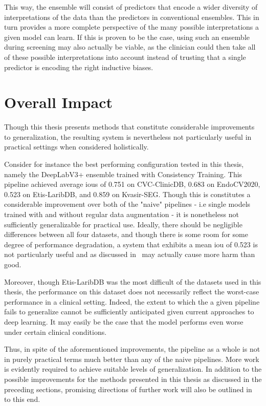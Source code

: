     This way, the ensemble will consist of predictors that encode a wider diversity of interpretations of the data than the predictors in conventional ensembles. This in turn provides a more complete perspective of the many possible interpretations a given model can learn. If this is proven to be the case, using such an ensemble during screening may also actually be viable, as the clinician could then take all of these possible interpretations into account instead of trusting that a single predictor is encoding the right inductive biases.  

\section{Overall Impact}
Though this thesis presents methods that constitute considerable improvements to generalization, the resulting system is nevertheless not particularly useful in practical settings when considered holistically. 

Consider for instance the best performing configuration tested in this thesis, namely the DeepLabV3+ ensemble trained with Consistency Training. This pipeline achieved average \glspl{iou} of 0.751 on CVC-ClinicDB, 0.683 on EndoCV2020, 0.523 on Etis-LaribDB, and 0.859 on Kvasir-SEG. Though this is constitutes a considerable improvement over both of the "naive" pipelines - i.e single models trained with and without regular data augmentation - it is nonetheless not sufficiently generalizable for practical use. Ideally, there should be negligible differences between all four datasets, and though there is some room for some degree of performance degradation, a system that exhibits a mean \gls{iou} of 0.523 is not particularly useful and as discussed in~ may actually cause more harm than good. 

Moreover, though Etis-LaribDB was the most difficult of the datasets used in this thesis, the performance on this dataset does not necessarily reflect the worst-case performance in a clinical setting. Indeed, the extent to which the a given pipeline fails to generalize cannot be sufficiently anticipated \cite{trust_ai} given current approaches to deep learning. It may easily be the case that the model performs even worse under certain clinical conditions.

Thus, in spite of the aforementioned improvements, the pipeline as a whole is not in purely practical terms much better than any of the naive pipelines. More work is evidently required to achieve suitable levels of generalization. In addition to the possible improvements for the methods presented in this thesis as discussed in the preceding sections, promising directions of further work will also be outlined in~ to this end. 

